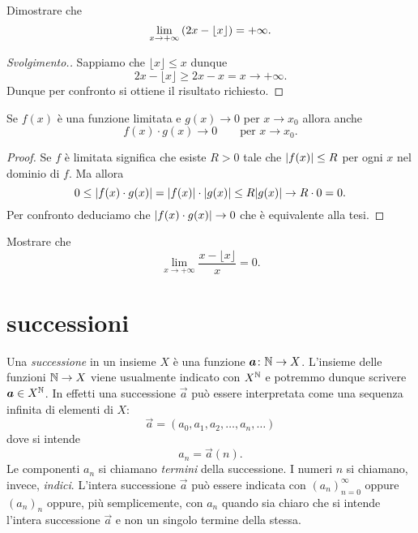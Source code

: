 \begin{example}
  Dimostrare che 
  \[
    \lim_{x\to +\infty} {\left( 2x - \lfloor x\rfloor \right)} = +\infty. 
  \]
\end{example}
\begin{proof}[Svolgimento.]
  Sappiamo che $\lfloor x\rfloor \le x$ dunque 
  \[
    2x - \lfloor x \rfloor \ge 2x -x = x \to +\infty.  
  \]
  Dunque per confronto si ottiene il risultato richiesto.
\end{proof}

\begin{corollary}%
\label{cor:limitata_per_infinitesima}%
\mymark{**}%
  Se $f(x)$ è una funzione limitata e $g(x)\to 0$ per 
  $x\to x_0$ allora anche
  \[
    f(x)\cdot g(x) \to 0 \qquad \text{per $x\to x_0.$} 
  \]
\end{corollary}
%
\begin{proof}
  Se $f$ è limitata significa che esiste $R>0$ tale che ${\left|f(x)\right|}\le R$
  per ogni $x$ nel dominio di $f$.
  Ma allora 
  \[
     0\le {\left|f(x)\cdot g(x)\right|} = {\left|f(x)\right|}\cdot {\left|g(x)\right|} 
     \le R {\left|g(x)\right|} \to R\cdot 0 = 0.
  \]
  Per confronto deduciamo che ${\left|f(x)\cdot g(x)\right|}\to 0$ 
  che è equivalente alla tesi.
\end{proof}

\begin{exercise}
  Mostrare che 
  \[
   \lim_{x\to +\infty} \frac{x-\lfloor x \rfloor}{x} = 0.  
  \]
\end{exercise}
%

\section{successioni}
\label{sec:successioni}

Una \emph{successione}%
%
 in un insieme $X$ è una
funzione $\boldsymbol a\colon {\mathbb N} \to X$.
L'insieme delle funzioni ${\mathbb N} \to X$ viene usualmente indicato
con $X^{\mathbb N}$ e potremmo dunque scrivere $\boldsymbol a \in X^{\mathbb N}$. 
In effetti una successione $\vec a$ può essere interpretata
come una sequenza infinita di elementi di $X$:
\[
  \vec a = (a_0, a_1, a_2, \dots, a_n, \dots )
\]
dove si intende
\[
   a_n = \vec a(n).
\]
Le componenti $a_n$ si chiamano \emph{termini} della successione.
I numeri $n$ si chiamano, invece, \emph{indici}.
L'intera
successione $\vec a$ può essere indicata con $(a_n)_{n=0}^\infty$
oppure $(a_n)_n$ oppure,
più semplicemente, con $a_n$ quando sia chiaro che si intende l'intera
successione $\vec a$ e non un singolo termine della stessa.%

